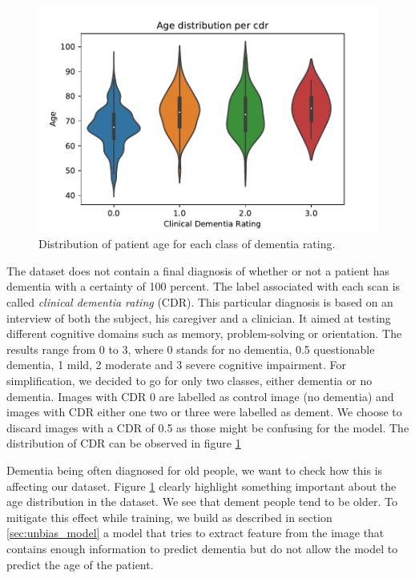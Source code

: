 \begin{figure}
 \centering
 \includegraphics[width=.9\linewidth]{figures/dataset/OASIS_age_dist_per_cdr.pdf}
 \captionsetup{width=.9\linewidth}
 \caption{Distribution of patient age for each class of dementia rating.}
 \label{fig:OASIS_age_dist}
\end{figure}

The dataset does not contain a final diagnosis of whether or not a patient has dementia with a certainty of 100 percent. The label associated with each scan is called \textit{clinical dementia rating} (CDR)\footnotemark. This particular diagnosis is based on an interview of both the subject, his caregiver and a clinician. It aimed at testing different cognitive domains such as memory, problem-solving or orientation. The results range from 0 to 3, where 0 stands for no dementia, 0.5 questionable dementia, 1 mild, 2 moderate and 3 severe cognitive impairment. For simplification, we decided to go for only two classes, either dementia or no dementia. Images with CDR 0 are labelled as control image (no dementia) and images with CDR either one two or three were labelled as dement. We choose to discard images with a CDR of 0.5 as those might be confusing for the model. The distribution of CDR can be observed in figure \ref{fig:OASIS_age_dist}

Dementia being often diagnosed for old people, we want to check how this is affecting our dataset. Figure \ref{fig:OASIS_age_dist} clearly highlight something important about the age distribution in the dataset. We see that dement people tend to be older. To mitigate this effect while training, we build as described in section \ref{sec:unbias_model} a model that tries to extract feature from the image that contains enough information to predict dementia but do not allow the model to predict the age of the patient. 


